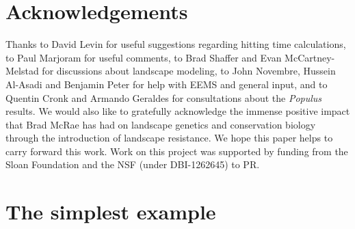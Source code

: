 \documentclass{article}
\newif\ifsubmission
\begin{document}
\section*{Acknowledgements}

Thanks to David Levin for useful suggestions regarding hitting time calculations,
to Paul Marjoram for useful comments,
to Brad Shaffer and Evan McCartney-Melstad for discussions about landscape modeling,
to John Novembre, Hussein Al-Asadi and Benjamin Peter for help with EEMS
and general input,
and to Quentin Cronk and Armando Geraldes for consultations about the \emph{Populus} results.
We would also like to gratefully acknowledge the immense positive impact that Brad McRae \citep[1966--2017;][]{lawler2018tribute}
has had on landscape genetics and conservation biology through the introduction of landscape resistance.
We hope this paper helps to carry forward this work.
Work on this project was supported by funding from
the Sloan Foundation and the NSF (under DBI-1262645) to PR.




\ifsubmission
\processdelayedfloats
\fi

\newpage


\appendix
\renewcommand{\thefigure}{S\arabic{figure}}
\setcounter{figure}{0}
\ifsubmission
    \renewcommand{\thepostfigure}{S\arabic{postfigure}}
    \setcounter{postfigure}{0}
\fi


\section{The simplest example}
\label{ss:simple_example}
\end{document}
